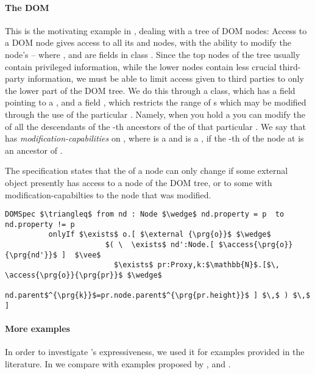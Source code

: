 \paragraph{The DOM}  %
\label{ss:DOM}
This is the motivating example in \cite{dd},
dealing with a tree of DOM nodes: Access to a DOM node
gives access to all its  and  nodes, with the ability to
modify the node's  -- where  ,  and 
are fields in class . Since the top nodes of the tree
usually contain privileged information, while the lower nodes contain
less crucial third-party information, we must be able to limit 
 access given to third parties to only the lower part of the DOM tree. We do this through a  class, which has a field  pointing to a , and a field , which restricts the range of s which may be modified through the use of the particular . Namely, when you hold a   you can modify the  of all the descendants of the    -th ancestors of the  of that particular .  We say that
 has \emph{modification-capabilities} on , where  is
a   and  is a , if the -th  
of the node at  is an ancestor of .


The specification  states that the  of a node can only change if
some external object presently has 
access to a node of the DOM tree, or to some  with modification-capabilties
to the node that was modified.
\begin{lstlisting}[language = Chainmail, mathescape=true, frame=lines]
DOMSpec $\triangleq$ from nd : Node $\wedge$ nd.property = p  to nd.property != p
          onlyIf $\exists$ o.[ $\external {\prg{o}}$ $\wedge$ 
                       $( \  \exists$ nd':Node.[ $\access{\prg{o}}{\prg{nd'}}$ ]  $\vee$ 
                         $\exists$ pr:Proxy,k:$\mathbb{N}$.[$\, \access{\prg{o}}{\prg{pr}}$ $\wedge$ 
                         nd.parent$^{\prg{k}}$=pr.node.parent$^{\prg{pr.height}}$ ] $\,$ ) $\,$ ]
\end{lstlisting}

\paragraph{More examples}
In order to investigate \Nec's expressiveness,  
we used it for
examples provided in the literature. 
In  %
we compare with examples proposed by  , and .
 


